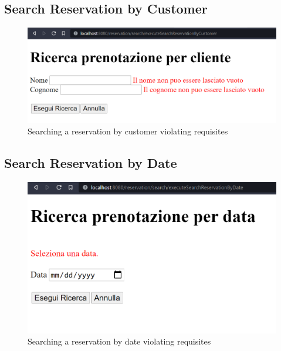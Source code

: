 \documentclass{article}
\begin{document}
\newpage
\subsection*{Search Reservation by Customer}
\label{sec:search_reservation_by_customer_errors}
\begin{figure}[H]
    \centering
    \includegraphics[width=\textwidth]{search_reservation_by_customer_errors}
    \caption{Searching a reservation by customer violating requisites}
    \label{fig:search_reservation_by_customer_errors}
\end{figure}


\newpage
\subsection*{Search Reservation by Date}
\label{sec:search_reservation_by_date_errors}
\begin{figure}[H]
    \centering
    \includegraphics[width=\textwidth]{search_reservation_by_date_errors}
    \caption{Searching a reservation by date violating requisites}
    \label{fig:search_reservation_by_date_errors}
\end{figure}
\end{document}
